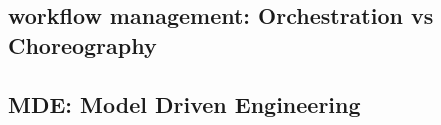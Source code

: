 \subsection{workflow management: Orchestration vs Choreography}

\subsection{MDE: Model Driven Engineering}
 


% 


